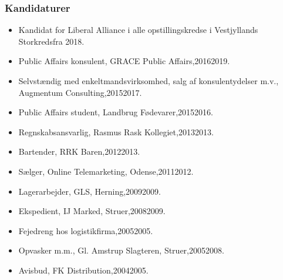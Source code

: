 \documentclass[11pt, a4paper]{awesome-cv}
\begin{document}
\begin{cvletter}
\subsubsection*{Kandidaturer}
\begin{itemize}
\item Kandidat for Liberal Alliance i alle opstillingskredse i Vestjyllands Storkredsfra 2018.
\end{itemize}
\begin{itemize}
\item Public Affairs konsulent, GRACE Public Affairs,20162019.
\item Selvstændig med enkeltmandsvirksomhed, salg af konsulentydelser m.v., Augmentum Consulting,20152017.
\item Public Affairs student, Landbrug  Fødevarer,20152016.
\item Regnskabsansvarlig, Rasmus Rask Kollegiet,20132013.
\item Bartender, RRK Baren,20122013.
\item Sælger, Online Telemarketing, Odense,20112012.
\item Lagerarbejder, GLS, Herning,20092009.
\item Ekspedient, IJ Marked, Struer,20082009.
\item Fejedreng hos logistikfirma,20052005.
\item Opvasker m.m., Gl. Amstrup Slagteren, Struer,20052008.
\item Avisbud, FK Distribution,20042005.
\end{itemize}
\end{cvletter}
\end{document}
